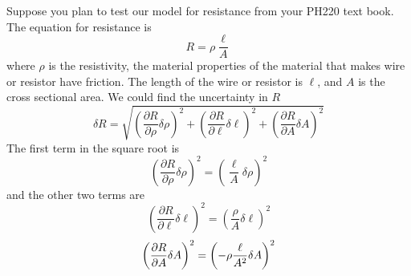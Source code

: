 Suppose you plan to test our model for resistance from your PH220 text book.
The equation for resistance is 
\begin{equation*}
R=\rho \frac{\ell }{A}
\end{equation*}%
where $\rho $ is the resistivity, the material properties of the material
that makes wire or resistor have friction. The length of the wire or
resistor is $\ell $, and $A$ is the cross sectional area. We could find the
uncertainty in $R$%
\begin{equation*}
\delta R=\sqrt{\left( \frac{\partial R}{\partial \rho }\delta \rho \right)
^{2}+\left( \frac{\partial R}{\partial \ell }\delta \ell \right) ^{2}+\left( 
\frac{\partial R}{\partial A}\delta A\right) ^{2}}
\end{equation*}%
The first term in the square root is 
\begin{equation*}
\left( \frac{\partial R}{\partial \rho }\delta \rho \right) ^{2}=\left( 
\frac{\ell }{A}\delta \rho \right) ^{2}
\end{equation*}%
and the other two terms are 
\begin{equation*}
\left( \frac{\partial R}{\partial \ell }\delta \ell \right) ^{2}=\left( 
\frac{\rho }{A}\delta \ell \right) ^{2}
\end{equation*}%
\begin{equation*}
\left( \frac{\partial R}{\partial A}\delta A\right) ^{2}=\left( -\rho \frac{%
\ell }{A^{2}}\delta A\right) ^{2}
\end{equation*}

